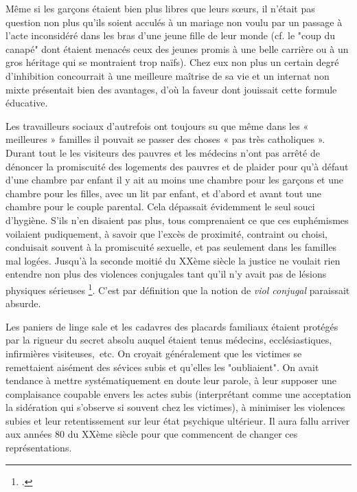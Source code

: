  Même si les garçons étaient bien plus libres que leurs sœurs, il n'était pas question non plus qu'ils soient acculés à un mariage non voulu par un passage à l'acte inconsidéré dans les bras d'une jeune fille de leur monde (cf. le "coup du canapé" dont étaient menacés ceux des jeunes promis à une belle carrière ou à un gros héritage qui se montraient trop naïfs). Chez eux non plus un certain degré d'inhibition concourrait à une meilleure maîtrise de sa vie et un internat non mixte présentait bien des avantages, d'où la faveur dont jouissait cette formule éducative.
 
  
 
 Les travailleurs sociaux d'autrefois ont toujours su que même dans les « meilleures » familles il pouvait se passer des choses « pas très catholiques ». Durant tout le  les visiteurs des pauvres et les médecins n'ont pas arrêté de dénoncer la promiscuité des logements des pauvres et de plaider pour qu'à défaut d'une chambre par enfant il y ait au moins une chambre pour les garçons et une chambre pour les filles, avec un lit par enfant, et d'abord et avant tout une chambre pour le couple parental. Cela dépassait évidemment le seul souci d'hygiène. S'ils n'en disaient pas plus, tous comprenaient ce que ces euphémismes voilaient pudiquement, à savoir que l'excès de proximité, contraint ou choisi, conduisait souvent à la promiscuité sexuelle, et pas seulement dans les familles mal logées. Jusqu'à la seconde moitié du XXème siècle la justice ne voulait rien entendre non plus des violences conjugales tant qu'il n'y avait pas de lésions physiques sérieuses
\footnote{.}. C'est par définition que la notion de \emph{viol conjugal} paraissait absurde.
 
 Les paniers de linge sale et les cadavres des placards familiaux étaient protégés par la rigueur du secret absolu auquel étaient tenus médecins, ecclésiastiques, infirmières visiteuses,~etc. On croyait généralement que les victimes se remettaient aisément des sévices subis et qu'elles les "oubliaient". On avait tendance à mettre systématiquement en doute leur parole, à leur supposer une complaisance coupable envers les actes subis (interprétant comme une acceptation la sidération qui s'observe si souvent chez les victimes), à minimiser les violences subies et leur retentissement sur leur état psychique ultérieur. Il aura fallu arriver aux années 80 du XXème siècle pour que commencent de changer ces représentations.
 

 

 

 

 
